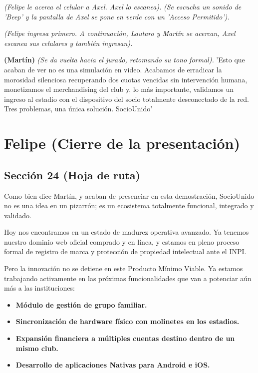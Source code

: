 \textit{(Felipe le acerca el celular a Axel. Axel lo escanea).}
\textit{(Se escucha un sonido de 'Beep' y la pantalla de Axel se pone en verde con un 'Acceso Permitido').}

\textit{(Felipe ingresa primero. A continuación, Lautaro y Martín se acercan, Axel escanea sus celulares y también ingresan).}

\textbf{(Martín)}
\textit{(Se da vuelta hacia el jurado, retomando su tono formal).}
'Esto que acaban de ver no es una simulación en video. Acabamos de erradicar la morosidad silenciosa recuperando dos cuotas vencidas sin intervención humana, monetizamos el merchandising del club y, lo más importante, validamos un ingreso al estadio con el dispositivo del socio totalmente desconectado de la red. Tres problemas, una única solución. SocioUnido'

\newpage

\section{Felipe (Cierre de la presentación)}

\subsection{Sección 24 (Hoja de ruta)}

Como bien dice Martín, y acaban de presenciar en esta demostración, SocioUnido no es una idea en un pizarrón; es un ecosistema totalmente funcional, integrado y validado.

Hoy nos encontramos en un estado de madurez operativa avanzado. Ya tenemos nuestro dominio web oficial comprado y en línea, y estamos en pleno proceso formal de registro de marca y protección de propiedad intelectual ante el INPI.

Pero la innovación no se detiene en este Producto Mínimo Viable. Ya estamos trabajando activamente en las próximas funcionalidades que van a potenciar aún más a las instituciones:
\begin{itemize}
    \item \textbf{Módulo de gestión de grupo familiar.}
    \item \textbf{Sincronización de hardware físico con molinetes en los estadios.}
    \item \textbf{Expansión financiera a múltiples cuentas destino dentro de un mismo club.}
    \item \textbf{Desarrollo de aplicaciones Nativas para Android e iOS.}
\end{itemize}

